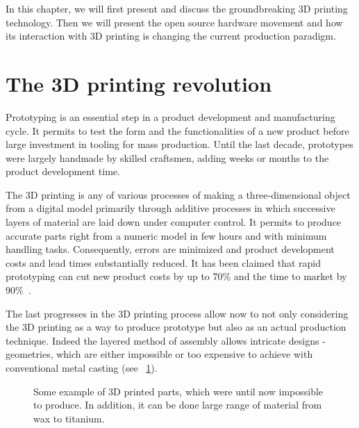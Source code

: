 In this chapter, we will first present and discuss the groundbreaking 3D printing technology. Then we will present the open source hardware movement and how its interaction with 3D printing is changing the current production paradigm.


\section{The 3D printing revolution} %

Prototyping is an essential step in a product development and manufacturing cycle. It permits to test the form and the functionalities of a new product before large investment in tooling for mass production. Until the last decade, prototypes were largely handmade by skilled craftsmen, adding weeks or months to the product development time.

The 3D printing is any of various processes of making a three-dimensional object from a digital model primarily through additive processes in which successive layers of material are laid down under computer control.
It permits to produce accurate parts right from a numeric model in few hours and with minimum handling tasks. Consequently, errors are minimized and product development costs and lead times substantially reduced. It has been claimed that rapid prototyping can cut new product costs by up to 70\% and the time to market by 90\%~\cite{waterman1994rapid}.

The last progresses in the 3D printing process allow now to not only considering the 3D printing as a way to produce prototype but also as an actual production technique. Indeed the layered method of assembly allows intricate designs - geometries, which are either impossible or too expensive to achieve with conventional metal casting (see \figurename~\ref{fig:3D_printed_objects}).


\begin{figure}[!b]
\centering
    \hfil
    \hfil
    \caption{Some example of 3D printed parts, which were until now impossible to produce. In addition, it can be done large range of material from wax to titanium.}
    \label{fig:3D_printed_objects}
\end{figure}


